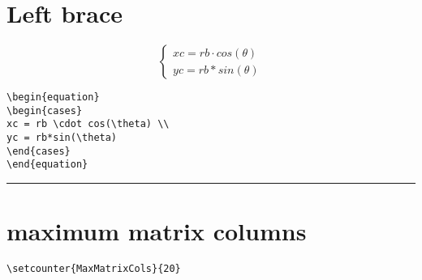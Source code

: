 \section{Left brace}

\begin{equation}
\begin{cases}
xc = rb \cdot cos(\theta) \\
yc = rb*sin(\theta)
\end{cases}
\end{equation}

\begin{verbatim}
\begin{equation}
\begin{cases}
xc = rb \cdot cos(\theta) \\
yc = rb*sin(\theta)
\end{cases}
\end{equation}
\end{verbatim}
\noindent\hrule\vspace{1em}

\section{maximum matrix columns}
\lstinline[language={[LaTeX]TeX}]|\setcounter{MaxMatrixCols}{20}|